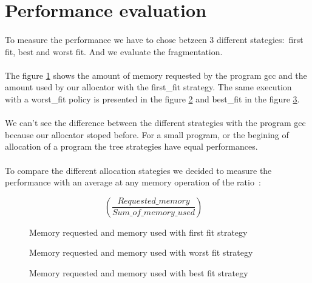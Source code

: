 \documentclass[a4paper,10pt]{article}
\begin{document}
\section{Performance evaluation}
\paragraph{}
To measure the performance we have to chose betzeen 3 different stategies:~first fit, 
best and worst fit. And we evaluate the fragmentation. 
 
\paragraph{}
The figure \ref{first} shows the amount of memory requested by the program gcc
and the amount used by our allocator with the first\_fit strategy. 
The same execution with a worst\_fit policy is presented in the figure \ref{worst}  
and best\_fit in the figure \ref{best}.

\paragraph{}
We can't see the difference between the different strategies with the program
gcc because our allocator stoped before. For a small program, or the begining
of allocation of a program the tree strategies have equal performances. 

\paragraph{}
To compare the different allocation stategies we decided to measure 
the performance with an average at any memory operation of the ratio~:

\begin{equation}
\left(\frac{Requested\_memory}{Sum\_of\_memory\_used} \right)  \quad
\end{equation}

\begin{figure}[ht]
\center 
\caption{Memory requested and memory used with first fit strategy}
\label{first}
\end{figure}
\begin{figure}[ht]
\center 
\caption{Memory requested and memory used with worst fit strategy}
\label{worst}
\end{figure}
\begin{figure}[ht]
\center 
\caption{Memory requested and memory used with best fit strategy}
\label{best}
\end{figure}
\end{document}
